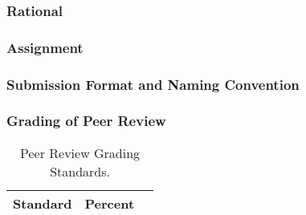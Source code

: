 
\subsubsection{Rational}

\subsubsection{Assignment}

\subsubsection{Submission Format and Naming Convention}

\subsubsection{Grading of Peer Review}


\begin{table}[h]
\caption{Peer Review Grading Standards.}
\label{tab:peerreviewgrading}
\begin{tabular}{lll}\hline
Standard      &   Percent   & \\ \hline\hline
\hline
\end{tabular}
\end{table}

